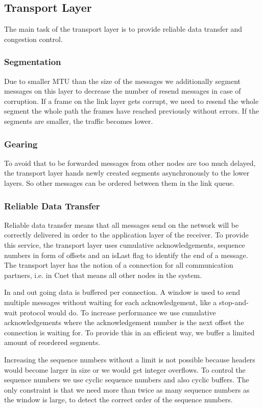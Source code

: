 \subsection{Transport Layer}
  The main task of the transport layer is to provide reliable data transfer and congestion control.

  \subsubsection{Segmentation}
  Due to smaller MTU than the size of the messages we additionally segment messages on this layer to decrease the number of resend messages in case of corruption. If a frame on the link layer gets corrupt, we need to resend the whole segment the whole path the frames have reached previously without errors. If the segments are smaller, the traffic becomes lower.

  \subsubsection{Gearing}
  To avoid that to be forwarded messages from other nodes are too much delayed, the transport layer hands newly created segments asynchronously to the lower layers. So other messages can be ordered between them in the link queue.

  \subsubsection{Reliable Data Transfer}
  Reliable data transfer means that all messages send on the network will be correctly delivered in order to the application layer of the receiver. To provide this service, the transport layer uses cumulative acknowledgements, sequence numbers in form of offsets and an isLast flag to identify the end of a message. The transport layer has the notion of a connection for all communication partners, i.e. in Cnet that means all other nodes in the system.
  
  In and out going data is buffered per connection. A window is used to send multiple messages without waiting for each acknowledgement, like a stop-and-wait protocol would do. To increase performance we use cumulative acknowledgements where the acknowledgement number is the next offset the connection is waiting for. To provide this in an efficient way, we buffer a limited amount of reordered segments.
  
  Increasing the sequence numbers without a limit is not possible because headers would become larger in size or we would get integer overflows. To control the sequence numbers we use cyclic sequence numbers and also cyclic buffers. The only constraint is that we need more than twice as many sequence numbers as the window is large, to detect the correct order of the sequence numbers.
  
